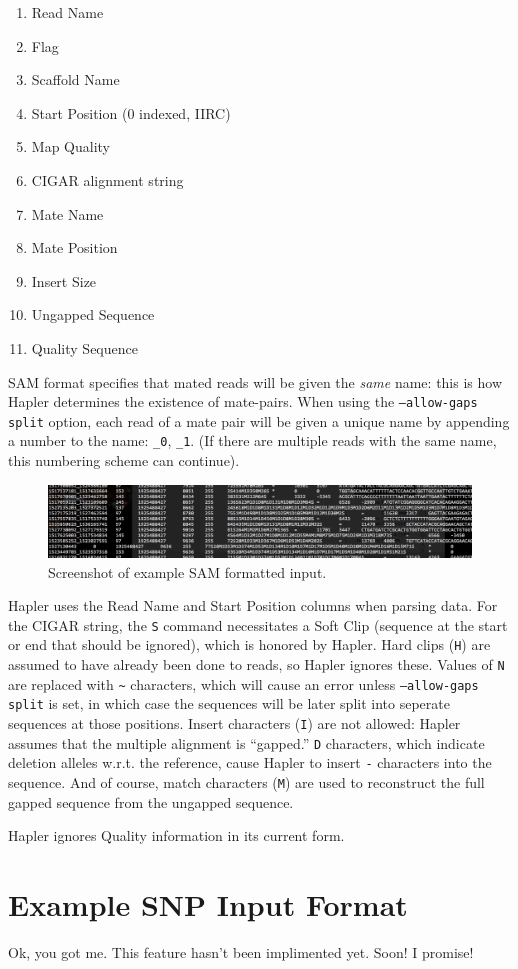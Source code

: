 \documentclass[11pt]{llncs}
\begin{document}
\begin{enumerate}
	\item Read Name
	\item Flag
	\item Scaffold Name
	\item Start Position (0 indexed, IIRC)
	\item Map Quality
	\item CIGAR alignment string
	\item Mate Name
	\item Mate Position
	\item Insert Size
	\item Ungapped Sequence
	\item Quality Sequence
\end{enumerate}

SAM format specifies that mated reads will be given the \emph{same} name: this is how Hapler determines the existence of mate-pairs. 
When using the \texttt{--allow-gaps split} option, each read of a mate pair will be given a unique name by appending a number to the name:
\verb=_0=, \verb=_1=. (If there are multiple reads with the same name, this numbering scheme can continue).

\begin{figure}[!h]
\centering
   \includegraphics[width=\textwidth]{graphics/Example_sam}
   \caption{Screenshot of example SAM formatted input.}
   \label{exampleSAM}
\end{figure}

Hapler uses the Read Name and Start Position columns when parsing data. For the CIGAR string, the \verb=S= command necessitates a Soft Clip (sequence
at the start or end that should be ignored), which is honored by Hapler. Hard clips (\verb=H=) are assumed to have already been done to reads, so
Hapler ignores these. Values of \verb=N= are replaced with \verb=~= characters, which will cause an error unless \texttt{--allow-gaps split} is set, in 
which case the sequences will be later split into seperate sequences at those positions. Insert characters (\verb=I=) are not allowed: Hapler
assumes that the multiple alignment is ``gapped.'' \verb=D= characters, which indicate deletion alleles w.r.t. the reference, cause Hapler to 
insert \verb=-= characters into the sequence. And of course, match characters (\verb=M=) are used to reconstruct the full gapped sequence from
the ungapped sequence. 

Hapler ignores Quality information in its current form.


\section{Example SNP Input Format}
\label{exampleSnpInputFormat}

Ok, you got me. This feature hasn't been implimented yet. Soon! I promise!




\end{document}
